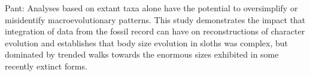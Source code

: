 Pant: Analyses based on extant taxa alone have the potential to oversimplify or misidentify macroevolutionary patterns. This study demonstrates the impact that integration of data from the fossil record can have on reconstructions of character evolution and establishes that body size evolution in sloths was complex, but dominated by trended walks towards the enormous sizes exhibited in some recently extinct forms.

